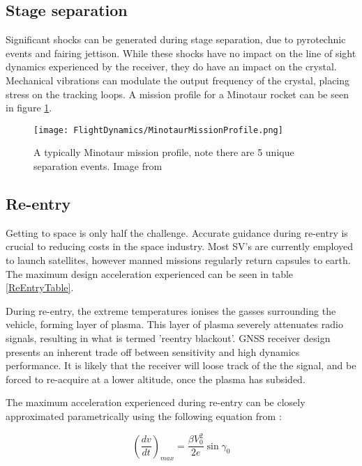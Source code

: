 


\subsection{Stage separation}

Significant shocks can be generated during stage separation, due to pyrotechnic events and fairing jettison\cite{AtlasV,Ariane,DeltaIV}. While these shocks have no impact on the line of sight dynamics experienced by the receiver, they do have an impact on the crystal. Mechanical vibrations can modulate the output frequency of the crystal, placing stress on the tracking loops. A mission profile for a Minotaur rocket can be seen in figure \ref{fig:MinotaurMissionProfile}.


\begin{figure}[!htb] 
    \centering
    \texttt{[image: FlightDynamics/MinotaurMissionProfile.png]} 
    \caption{A typically Minotaur mission profile, note there are 5 unique separation events. Image from \cite{Minotaur}}
    \label{fig:MinotaurMissionProfile}
\end{figure}

\subsection{Re-entry}
Getting to space is only half the challenge. Accurate guidance during re-entry is crucial to reducing costs in the space industry. Most \ac{SV}'s are currently employed to launch satellites, however manned missions regularly return capsules to earth. The maximum design acceleration experienced can be seen in table \ref{ReEntryTable}. 

During re-entry, the extreme temperatures ionises the gasses surrounding the vehicle, forming  layer of plasma. This layer of plasma severely attenuates radio signals, resulting in what is termed 'reentry blackout'. GNSS receiver design presents an inherent trade off between sensitivity and high dynamics performance. It is likely that the receiver will loose track of the the signal, and be forced to re-acquire at a lower altitude, once the plasma has subsided. 




The maximum acceleration experienced during re-entry can be closely approximated parametrically using the following equation from \cite{eastre}: 

\begin{equation}
(\frac{dv}{dt})_{max} = \frac{\beta V_0^2}{2e} \sin \gamma_0
\end{equation}


